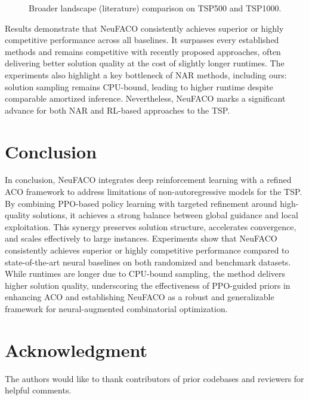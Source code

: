 \documentclass[a4paper,conference]{IEEEtran}
\begin{document}
\begin{figure}[!tb]
{\begin{tabular}{l ccc ccc}
\bottomrule[1pt]
\end{tabular}
}%

\caption{Broader landscape (literature) comparison on TSP500 and TSP1000.}
\label{fig:tsp-results}
\end{figure}

Results demonstrate that NeuFACO consistently achieves superior or highly competitive performance across all baselines. It surpasses every established methods and remains competitive with recently proposed approaches, often delivering better solution quality at the cost of slightly longer runtimes. The experiments also highlight a key bottleneck of NAR methods, including ours: solution sampling remains CPU-bound, leading to higher runtime despite comparable amortized inference. Nevertheless, NeuFACO marks a significant advance for both NAR and RL-based approaches to the TSP.

\section{Conclusion}
In conclusion, NeuFACO integrates deep reinforcement learning with a refined ACO framework to address limitations of non-autoregressive models for the TSP. By combining PPO-based policy learning with targeted refinement around high-quality solutions, it achieves a strong balance between global guidance and local exploitation. This synergy preserves solution structure, accelerates convergence, and scales effectively to large instances. Experiments show that NeuFACO consistently achieves superior or highly competitive performance compared to state-of-the-art neural baselines on both randomized and benchmark datasets. While runtimes are longer due to CPU-bound sampling, the method delivers higher solution quality, underscoring the effectiveness of PPO-guided priors in enhancing ACO and establishing NeuFACO as a robust and generalizable framework for neural-augmented combinatorial optimization.

\section*{Acknowledgment}
The authors would like to thank contributors of prior codebases and reviewers for helpful comments.



\end{document}
